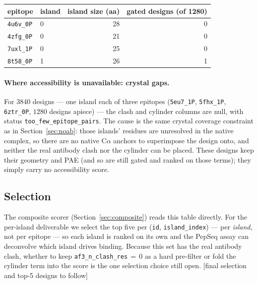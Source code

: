 \begin{center}
\begin{tabular}{llrr}
\toprule
epitope & island & island size (aa) & gated designs (of \num{1280}) \\
\midrule
\texttt{4u6v\_0P} & 0 & 28 & 0 \\
\texttt{4zfg\_0P} & 0 & 21 & 0 \\
\texttt{7uxl\_1P} & 0 & 25 & 0 \\
\texttt{8t58\_0P} & 1 & 26 & 1 \\
\bottomrule
\end{tabular}
\label{tab:shortislands}
\end{center}

\paragraph{Where accessibility is unavailable: crystal gaps.}
For \num{3840} designs --- one island each of three epitopes (\texttt{5eu7\_1P},
\texttt{5fhx\_1P}, \texttt{6ztr\_0P}, $\num{1280}$ designs apiece) --- the clash and cylinder
columns are null, with status \texttt{too\_few\_epitope\_pairs}. The cause is the same crystal
coverage constraint as in Section~\ref{sec:noab}: those islands' residues are unresolved in
the native complex, so there are no native C$\alpha$ anchors to superimpose the design onto,
and neither the real antibody clash nor the cylinder can be placed. These designs keep their
geometry and PAE (and so are still gated and ranked on those terms); they simply carry no
accessibility score.

\subsection{Selection}\label{sec:selection}
The composite scorer (Section~\ref{sec:composite}) reads this table directly. For the
per-island deliverable we select the top five per (\texttt{id}, \texttt{island\_index}) ---
per \emph{island}, not per epitope --- so each island is ranked on its own and the PepSeq
assay can deconvolve which island drives binding. Because this set has the real antibody
clash, whether to keep \texttt{af3\_n\_clash\_res}$\,=\,0$ as a hard pre-filter or fold the
cylinder term into the score is the one selection choice still open. [final selection and
top-5 designs to follow]

